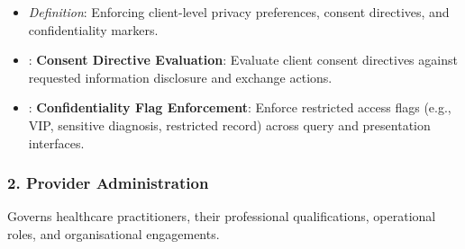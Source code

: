 \begin{itemize}
\begin{itemize}

\item
\emph{Definition}: Enforcing client-level privacy preferences, consent directives, and confidentiality markers.



\item
\texttt{}: \textbf{Consent Directive Evaluation}: Evaluate client consent directives against requested information disclosure and exchange actions.



\item
\texttt{}: \textbf{Confidentiality Flag Enforcement}: Enforce restricted access flags (e.g., VIP, sensitive diagnosis, restricted record) across query and presentation interfaces.



\end{itemize}


\end{itemize}
\label{rad:enabling:137}
\subsubsection*{2. Provider Administration}
\label{rad:enabling:138}

Governs healthcare practitioners, their professional qualifications, operational roles, and organisational engagements.

\label{rad:enabling:140}

